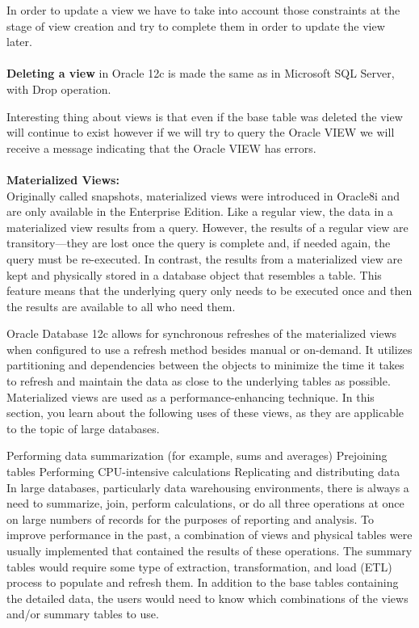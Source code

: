 In order to update a view we have to take into account those constraints at the stage of view creation and try to complete them in order to update the view later. \\
\\

\textbf{Deleting a view} in Oracle 12c is made the same as in Microsoft SQL Server, with Drop operation.


Interesting thing about views is that even if the base table was deleted the view will continue to exist however if we will try to query the Oracle VIEW we will receive a message indicating that the Oracle VIEW has errors.\\
\\
\textbf{Materialized Views:}\\
Originally called snapshots, materialized views were introduced in Oracle8i and are only available in the Enterprise Edition. Like a regular view, the data in a materialized view results from a query. However, the results of a regular view are transitory—they are lost once the query is complete and, if needed again, the query must be re-executed. In contrast, the results from a materialized view are kept and physically stored in a database object that resembles a table. This feature means that the underlying query only needs to be executed once and then the results are available to all who need them.

Oracle Database 12c allows for synchronous refreshes of the materialized views when configured to use a refresh method besides manual or on-demand. It utilizes partitioning and dependencies between the objects to minimize the time it takes to refresh and maintain the data as close to the underlying tables as possible.
Materialized views are used as a performance-enhancing technique. In this section, you learn about the following uses of these views, as they are applicable to the topic of large databases.

Performing data summarization (for example, sums and averages)
Prejoining tables
Performing CPU-intensive calculations
Replicating and distributing data
In large databases, particularly data warehousing environments, there is always a need to summarize, join, perform calculations, or do all three operations at once on large numbers of records for the purposes of reporting and analysis. To improve performance in the past, a combination of views and physical tables were usually implemented that contained the results of these operations. The summary tables would require some type of extraction, transformation, and load (ETL) process to populate and refresh them. In addition to the base tables containing the detailed data, the users would need to know which combinations of the views and/or summary tables to use. 

